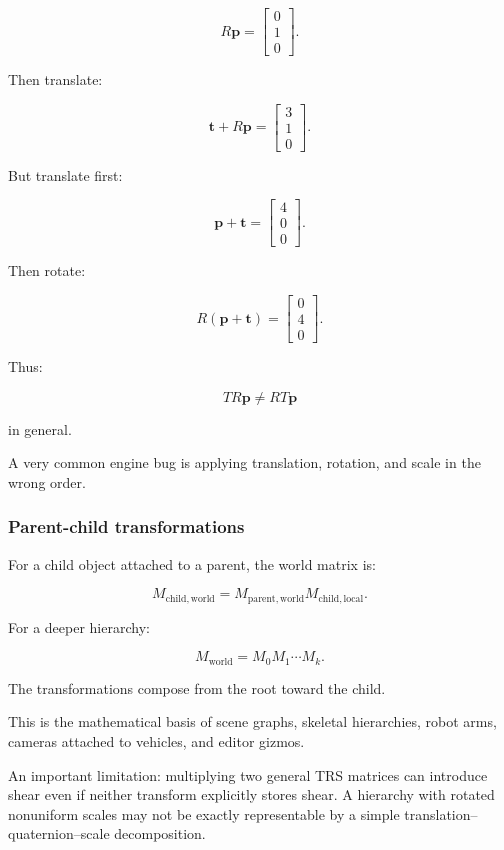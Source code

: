 \[
 R\mathbf p= \begin{bmatrix}0\\1\\0\end{bmatrix}.
\]

Then translate:

\[
 \mathbf t+R\mathbf p= \begin{bmatrix}3\\1\\0\end{bmatrix}.
\]

But translate first:

\[
 \mathbf p+\mathbf t= \begin{bmatrix}4\\0\\0\end{bmatrix}.
\]

Then rotate:

\[
 R(\mathbf p+\mathbf t)= \begin{bmatrix}0\\4\\0\end{bmatrix}.
\]

Thus:

\[
 \boxed{TR\mathbf p\ne RT\mathbf p}
\]

in general.

A very common engine bug is applying translation, rotation, and scale in the wrong order.

\subsubsection{Parent-child transformations}\label{02-foundations-ii-ch032-parent-child-transformations}

For a child object attached to a parent, the world matrix is:

\[
 \boxed{ M_{\mathrm{child,world}} = M_{\mathrm{parent,world}} M_{\mathrm{child,local}} }.
\]

For a deeper hierarchy:

\[
 M_{\mathrm{world}} = M_0M_1\cdots M_k.
\]

The transformations compose from the root toward the child.

This is the mathematical basis of scene graphs, skeletal hierarchies, robot arms, cameras attached to vehicles, and editor gizmos.

An important limitation: multiplying two general TRS matrices can introduce shear even if neither transform explicitly stores shear. A hierarchy with rotated nonuniform scales may not be exactly representable by a simple translation--quaternion--scale decomposition.

